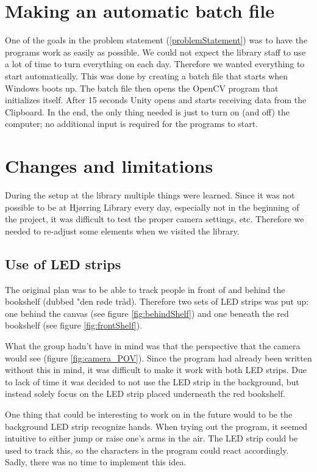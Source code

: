 \section{Making an automatic batch file}
One of the goals in the problem statement (\ref{problemStatement}) was to have the programs work as easily as possible. We could not expect the library staff to use a lot of time to turn everything on each day. Therefore we wanted everything to start automatically. This was done by creating a batch file that starts when Windows boots up. The batch file then opens the OpenCV program that initializes itself. After 15 seconds Unity opens and starts receiving data from the Clipboard. In the end, the only thing needed is just to turn on (and off) the computer; no additional input is required for the programs to start.

\section{Changes and limitations}
During the setup at the library multiple things were learned. Since it was not possible to be at Hj{\o}rring Library every day, especially not in the beginning of the project, it was difficult to test the proper camera settings, etc. Therefore we needed to re-adjust some elements when we visited the library.

\subsection{Use of LED strips}
The original plan was to be able to track people in front of and behind the bookshelf (dubbed "den r{\o}de tr{\aa}d). Therefore two sets of LED strips was put up: one behind the canvas (see figure \ref{fig:behindShelf}) and one beneath the red bookshelf (see figure \ref{fig:frontShelf}).

What the group hadn't have in mind was that the perspective that the camera would see (figure \ref{fig:camera_POV}). Since the program had already been written without this in mind, it was difficult to make it work with both LED strips. Due to lack of time it was decided to not use the LED strip in the background, but instead solely focus on the LED strip placed underneath the red bookshelf.

One thing that could be interesting to work on in the future would to be the background LED strip recognize hands. When trying out the program, it seemed intuitive to either jump or raise one's arms in the air. The LED strip could be used to track this, so the characters in the program could react accordingly. Sadly, there was no time to implement this idea.

